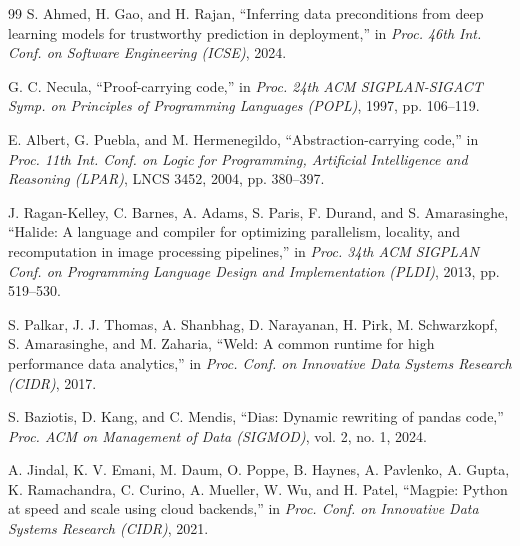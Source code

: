 \begin{thebibliography}{99}
S. Ahmed, H. Gao, and H. Rajan, ``Inferring data preconditions from deep learning models for
trustworthy prediction in deployment,'' in \emph{Proc. 46th Int. Conf. on Software Engineering
(ICSE)}, 2024.

G. C. Necula, ``Proof-carrying code,'' in \emph{Proc. 24th ACM SIGPLAN-SIGACT Symp. on Principles of
Programming Languages (POPL)}, 1997, pp. 106--119.

E. Albert, G. Puebla, and M. Hermenegildo, ``Abstraction-carrying code,'' in \emph{Proc. 11th Int.
Conf. on Logic for Programming, Artificial Intelligence and Reasoning (LPAR)}, LNCS 3452, 2004,
pp. 380--397.

J. Ragan-Kelley, C. Barnes, A. Adams, S. Paris, F. Durand, and S. Amarasinghe, ``Halide: A language
and compiler for optimizing parallelism, locality, and recomputation in image processing
pipelines,'' in \emph{Proc. 34th ACM SIGPLAN Conf. on Programming Language Design and
Implementation (PLDI)}, 2013, pp. 519--530.

S. Palkar, J. J. Thomas, A. Shanbhag, D. Narayanan, H. Pirk, M. Schwarzkopf, S. Amarasinghe, and
M. Zaharia, ``Weld: A common runtime for high performance data analytics,'' in \emph{Proc. Conf. on
Innovative Data Systems Research (CIDR)}, 2017.

S. Baziotis, D. Kang, and C. Mendis, ``Dias: Dynamic rewriting of pandas code,'' \emph{Proc. ACM
on Management of Data (SIGMOD)}, vol. 2, no. 1, 2024.

A. Jindal, K. V. Emani, M. Daum, O. Poppe, B. Haynes, A. Pavlenko, A. Gupta, K. Ramachandra,
C. Curino, A. Mueller, W. Wu, and H. Patel, ``Magpie: Python at speed and scale using cloud
backends,'' in \emph{Proc. Conf. on Innovative Data Systems Research (CIDR)}, 2021.

\end{thebibliography}
